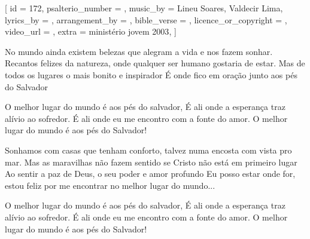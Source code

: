 
[
    id                     = {172},
    psalterio_number       = {},
    music_by               = {Lineu Soares, Valdecir Lima},
    lyrics_by              = {},
    arrangement_by         = {},
    bible_verse            = {},
    licence_or_copyright   = {},
    video_url              = {},
    extra                  = {ministério jovem 2003},
]

\beginverse
No mundo ainda existem belezas que alegram a vida e nos fazem sonhar.
Recantos felizes da natureza, onde qualquer ser humano gostaria de estar.
Mas de todos os lugares o mais bonito e inspirador
É onde fico em oração junto aos pés do Salvador
\endverse

\beginchorus
O melhor lugar do mundo é aos pés do salvador,
É ali onde a esperança traz alívio ao sofredor.
É ali onde eu me encontro com a fonte do amor.
O melhor lugar do mundo é aos pés do Salvador!
\endchorus

\beginverse
Sonhamos com casas que tenham conforto, talvez numa encosta com vista pro mar.
Mas as maravilhas não fazem sentido se Cristo não está em primeiro lugar
Ao sentir a paz de Deus, o seu poder e amor profundo
Eu posso estar onde for, estou feliz por me encontrar no melhor lugar do mundo...
\endverse

\beginchorus
O melhor lugar do mundo é aos pés do salvador,
É ali onde a esperança traz alívio ao sofredor.
É ali onde eu me encontro com a fonte do amor.
O melhor lugar do mundo é aos pés do Salvador!
\endchorus


\endsong
